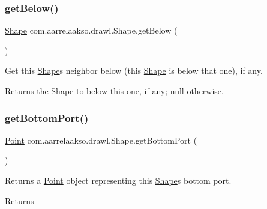 \subsubsection{\texorpdfstring{get\+Below()}{getBelow()}}
{\footnotesize\ttfamily \hyperlink{classcom_1_1aarrelaakso_1_1drawl_1_1_shape}{Shape} com.\+aarrelaakso.\+drawl.\+Shape.\+get\+Below (\begin{DoxyParamCaption}{ }\end{DoxyParamCaption})\hspace{0.3cm}{\ttfamily [inherited]}}



Get this \hyperlink{classcom_1_1aarrelaakso_1_1drawl_1_1_shape}{Shape}\textquotesingle{}s neighbor below (this \hyperlink{classcom_1_1aarrelaakso_1_1drawl_1_1_shape}{Shape} is below that one), if any. 

\begin{DoxyReturn}{Returns}
the \hyperlink{classcom_1_1aarrelaakso_1_1drawl_1_1_shape}{Shape} to below this one, if any; {\ttfamily null} otherwise. 
\end{DoxyReturn}
\mbox{\label{classcom_1_1aarrelaakso_1_1drawl_1_1_shape_aba14efe9a16c0808580963c66b171082}} 
\subsubsection{\texorpdfstring{get\+Bottom\+Port()}{getBottomPort()}}
{\footnotesize\ttfamily \hyperlink{classcom_1_1aarrelaakso_1_1drawl_1_1_point}{Point} com.\+aarrelaakso.\+drawl.\+Shape.\+get\+Bottom\+Port (\begin{DoxyParamCaption}{ }\end{DoxyParamCaption})\hspace{0.3cm}{\ttfamily [inherited]}}



Returns a \hyperlink{classcom_1_1aarrelaakso_1_1drawl_1_1_point}{Point} object representing this \hyperlink{classcom_1_1aarrelaakso_1_1drawl_1_1_shape}{Shape}\textquotesingle{}s bottom port. 

\begin{DoxyReturn}{Returns}

\end{DoxyReturn}
\mbox{\label{classcom_1_1aarrelaakso_1_1drawl_1_1_circle_ab1971c353febd9bc5f5633e9b6e5611e}} 
